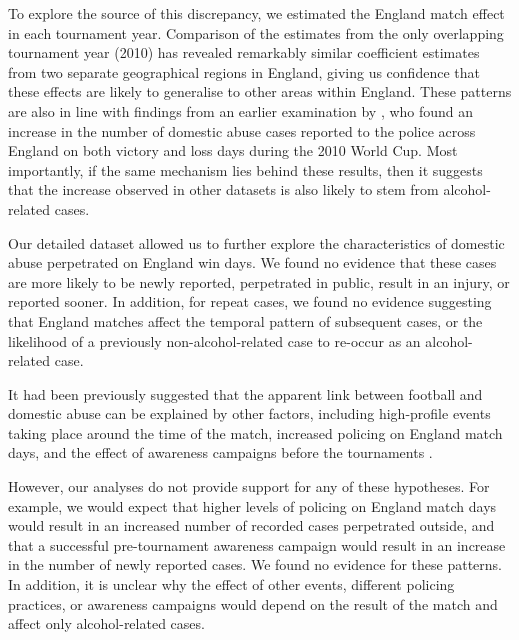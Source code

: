 \documentclass[12pt, a4paper]{article}
\begin{document}
To explore the source of this discrepancy, we estimated the England match effect in each tournament year. Comparison of the estimates from the only overlapping tournament year (2010) has revealed remarkably similar coefficient estimates from two separate geographical regions in England, giving us confidence that these effects are likely to generalise to other areas within England. These patterns are also in line with findings from an earlier examination by \cite{Brimicombe2012}, who found an increase in the number of domestic abuse cases reported to the police across England on both victory and loss days during the 2010 World Cup.  Most importantly, if the same mechanism lies behind these results, then it suggests that the increase observed in other datasets is also likely to stem from alcohol-related cases.

Our detailed dataset allowed us to further explore the characteristics of domestic abuse perpetrated on England win days. We found no evidence that these cases are more likely to be newly reported, perpetrated in public, result in an injury, or reported sooner. In addition, for repeat cases, we found no evidence suggesting that England matches affect the temporal pattern of subsequent cases, or the likelihood of a previously non-alcohol-related case to re-occur as an alcohol-related case.




It had been previously suggested that the apparent link between football and domestic abuse can be explained by other factors, including high-profile events taking place around the time of the match, increased policing on England match days, and the effect of awareness campaigns before the tournaments \cite{Brooks-Hay2018}.

However, our analyses do not provide support for any of these hypotheses. For example, we would expect that higher levels of policing on England match days would result in an increased number of recorded cases perpetrated outside, and that a successful pre-tournament awareness campaign would result in an increase in the number of newly reported cases. We found no evidence for these patterns. In addition, it is unclear why the effect of other events, different policing practices, or awareness campaigns would depend on the result of the match and affect only alcohol-related cases.
\end{document}
